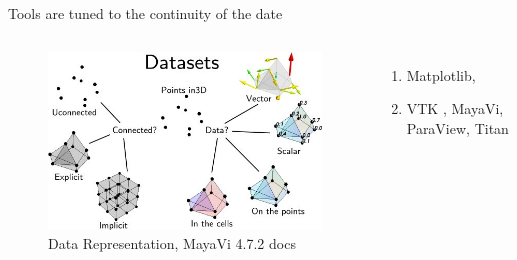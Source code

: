 \documentclass[xcolor={dvipsnames}, handout]{beamer}
\begin{document}
\begin{frame}{Tools are tuned to the continuity of the date \cite{HeerSoftware2006,toryRethinkingVisualizationHighlevel2004}}
\begin{columns}
\begin{figure}
            \includegraphics[width=1\textwidth]{figures/intro/dataset_diagram.png}
            \caption{Data Representation, MayaVi 4.7.2 docs\cite{DataRepresentationMayavi}}
        \end{figure}
        \begin{enumerate}
            \item Matplotlib\cite{hunterMatplotlib2DGraphics2007}, 
            \item VTK \cite{hanwellVisualizationToolkitVTK2015,geveci2012vtk}, MayaVi\cite{RamachandranMayaVI2011}, ParaView\cite{ahrens2005paraview}, Titan\cite{brianwylieUnifiedToolkitInformation2009}
        \end{enumerate}
    \end{columns}
\end{frame}
\end{document}
